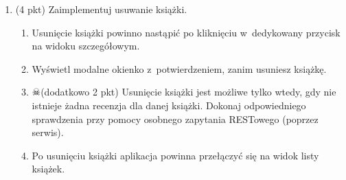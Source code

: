 \documentclass[12pt]{article}
\begin{document}
\begin{enumerate}
		\item
			(4 pkt) Zaimplementuj usuwanie książki. 
			\begin{enumerate}
				\item Usunięcie książki powinno nastąpić po kliknięciu w~dedykowany przycisk na widoku szczegółowym.
				\item Wyświetl modalne okienko z~potwierdzeniem, zanim usuniesz książkę.
				\item $\skull$(dodatkowo 2 pkt) Usunięcie książki jest możliwe tylko wtedy, gdy nie istnieje żadna recenzja dla danej książki. Dokonaj odpowiedniego sprawdzenia przy pomocy osobnego zapytania RESTowego (poprzez serwis).
				\item Po usunięciu książki aplikacja powinna przełączyć się na widok listy książek.
			\end{enumerate}

    \end{enumerate}
\end{document}
